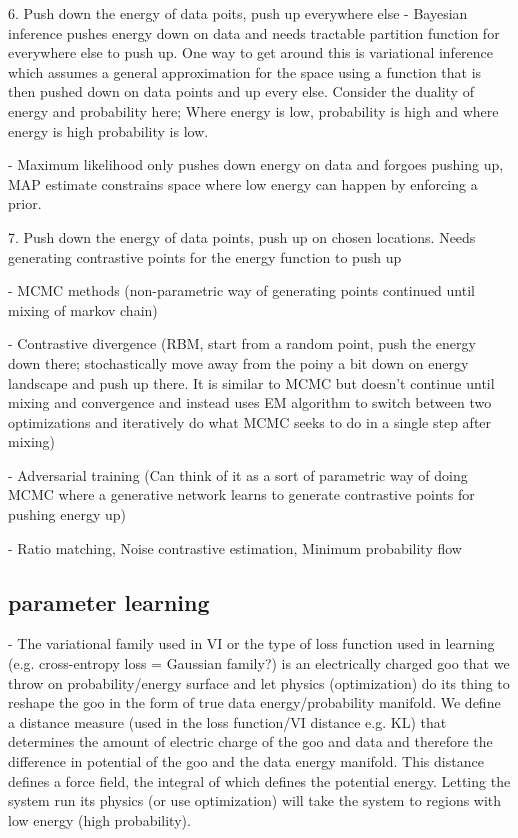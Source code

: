 \documentclass[aps,preprint,showpacs,superscriptaddress,groupedaddress]{revtex4}  %
\begin{document}
6. Push down the energy of data poits, push up everywhere else
- Bayesian inference pushes energy down on data and needs tractable partition function for everywhere else to push up. One way to get around this is variational inference which assumes a general approximation for the space using a function that is then pushed down on data points and up every else. Consider the duality of energy and probability here; Where energy is low, probability is high and where energy is high probability is low. 

- Maximum likelihood only pushes down energy on data and forgoes pushing up, MAP estimate constrains space where low energy can happen by enforcing a prior. 

7. Push down the energy of data points, push up on chosen locations. Needs generating contrastive points for the energy function to push up

- MCMC methods (non-parametric way of generating points continued until mixing of markov chain)

- Contrastive divergence (RBM, start from a random point, push the energy down there; stochastically move away from the poiny a bit down on energy landscape and push up there. It is similar to MCMC but doesn't continue until mixing and convergence and instead uses EM algorithm to switch between two optimizations and iteratively do what MCMC seeks to do in a single step after mixing)

- Adversarial training (Can think of it as a sort of parametric way of doing MCMC where a generative network learns to generate contrastive points for pushing energy up)

- Ratio matching, Noise contrastive estimation, Minimum probability flow


\subsection{parameter learning}

- The variational family used in VI or the type of loss function used in learning  (e.g. cross-entropy loss = Gaussian family?) is an electrically charged goo that we throw on probability/energy surface and let physics (optimization) do its thing to reshape the goo in the form of true data energy/probability manifold. We define a distance measure (used in the loss function/VI distance e.g. KL) that determines the amount of electric charge of the goo and data and therefore the difference in potential of the goo and the data energy manifold. This distance defines a force field, the integral of which defines the potential energy. Letting the system run its physics (or use optimization) will take the system to regions with low energy (high probability).
\end{document}
